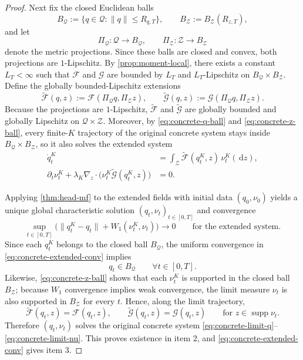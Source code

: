 \documentclass{article}
\theoremstyle{definition}
\newcommand{\W}{W_1}
\newcommand{\dd}{\,\mathrm{d}}
\begin{document}
\begin{proof}
Next fix the closed Euclidean balls
\[
  B_{\mathcal Q}:=\{q\in\mathcal Q:\|q\|\le R_{q,T}\},
  \qquad
  B_{\mathcal Z}:=B_{\mathcal Z}(R_{z,T}),
\]
and let
\[
  \Pi_{\mathcal Q}:\mathcal Q\to B_{\mathcal Q},
  \qquad
  \Pi_{\mathcal Z}:\mathcal Z\to B_{\mathcal Z}
\]
denote the metric projections. Since these balls are closed and convex, both projections are $1$-Lipschitz. By \cref{prop:moment-local}, there exists a constant $L_T<\infty$ such that $\mathcal F$ and $\mathcal G$ are bounded by $L_T$ and $L_T$-Lipschitz on $B_{\mathcal Q}\times B_{\mathcal Z}$. Define the globally bounded-Lipschitz extensions
\[
  \widetilde{\mathcal F}(q,z)
  :=
  \mathcal F(\Pi_{\mathcal Q}q,\Pi_{\mathcal Z}z),
  \qquad
  \widetilde{\mathcal G}(q,z)
  :=
  \mathcal G(\Pi_{\mathcal Q}q,\Pi_{\mathcal Z}z).
\]
Because the projections are $1$-Lipschitz, $\widetilde{\mathcal F}$ and $\widetilde{\mathcal G}$ are globally bounded and globally Lipschitz on $\mathcal Q\times\mathcal Z$. Moreover, by \eqref{eq:concrete-q-ball} and \eqref{eq:concrete-z-ball}, every finite-$K$ trajectory of the original concrete system stays inside $B_{\mathcal Q}\times B_{\mathcal Z}$, so it also solves the extended system
\begin{align}
  \dot q_t^K
  &=
  \int_{\mathcal Z}\widetilde{\mathcal F}(q_t^K,z)\,\nu_t^K(\dd z),
  \label{eq:concrete-extended-q}
  \\
  \partial_t \nu_t^K
  +
  \lambda_K\nabla_z\cdot\bigl(
    \nu_t^K\widetilde{\mathcal G}(q_t^K,z)
  \bigr)
  &=
  0.
  \label{eq:concrete-extended-nu}
\end{align}

Applying \cref{thm:head-mf} to the extended fields with initial data $(q_0,\nu_0)$ yields a unique global characteristic solution $(q_t,\nu_t)_{t\in[0,T]}$ and convergence
\begin{equation}
  \sup_{t\in[0,T]}
  \bigl(
    \|q_t^K-q_t\|+\W(\nu_t^K,\nu_t)
  \bigr)
  \to 0
  \qquad
  \text{for the extended system.}
  \label{eq:concrete-extended-conv}
\end{equation}
Since each $q_t^K$ belongs to the closed ball $B_{\mathcal Q}$, the uniform convergence in \eqref{eq:concrete-extended-conv} implies
\[
  q_t\in B_{\mathcal Q}
  \qquad
  \forall t\in[0,T].
\]
Likewise, \eqref{eq:concrete-z-ball} shows that each $\nu_t^K$ is supported in the closed ball $B_{\mathcal Z}$; because $\W$ convergence implies weak convergence, the limit measure $\nu_t$ is also supported in $B_{\mathcal Z}$ for every $t$. Hence, along the limit trajectory,
\[
  \widetilde{\mathcal F}(q_t,z)=\mathcal F(q_t,z),
  \qquad
  \widetilde{\mathcal G}(q_t,z)=\mathcal G(q_t,z)
  \qquad
  \text{for } z\in\operatorname{supp}\nu_t.
\]
Therefore $(q_t,\nu_t)$ solves the original concrete system \eqref{eq:concrete-limit-q}--\eqref{eq:concrete-limit-nu}. This proves existence in item 2, and \eqref{eq:concrete-extended-conv} gives item 3.


\end{proof}
\end{document}
